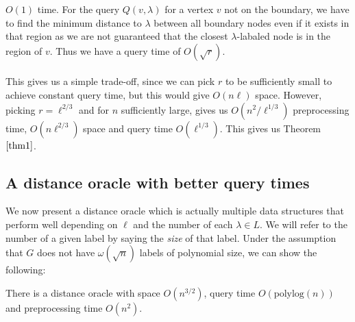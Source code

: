 $O(1)$ time. For the query $Q(v,\lambda)$ for a vertex $v$ not on the boundary, we have
to find the minimum distance to $\lambda$ between all boundary nodes even if it exists in
that region as we are not guaranteed that the closest $\lambda$-labaled node is in the
region of $v$. Thus we have a query time of $O(\sqrt{r})$. \\
\\
This gives us a simple trade-off, since we can pick $r$ to be sufficiently small to
achieve constant query time, but this would give $O(n\ell)$ space. However, picking
$r=\ell^{2/3}$ and for $n$ sufficiently large, gives us $O(n^2/\ell^{1/3})$ preprocessing time, $O(n\ell^{2/3})$ space and query time $O(\ell^{1/3})$. This gives us Theorem $\ref{thm1}$.

\subsection{A distance oracle with better query times}\label{oracle2}
We now present a distance oracle which is actually multiple data structures that perform
well depending on $\ell$ and the number of each $\lambda\in L$. We will refer to the
number of a given label by saying the \textit{size} of that label. Under the assumption
that $G$ does not have $\omega(\sqrt{n})$ labels of polynomial size, we can show the
following:
\begin{thm}\label{thm2}
  There is a distance oracle with space $O(n^{3/2})$, query time $O(\text{polylog}(n))$ and
  preprocessing time $O(n^2)$.
\end{thm}

